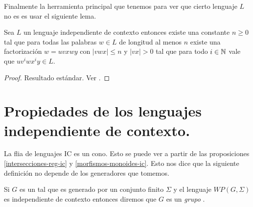 \documentclass[tesis.tex]{subfiles}
\begin{document}
Finalmente la herramienta principal que tenemos para ver que cierto lenguaje $L$ no es \ic es usar el siguiente lema.

\begin{lema}[Pumping] \label{pumping}
	Sea $L$ un lenguaje independiente de contexto entonces existe una constante $n \ge 0$ tal que para todas las palabras $w \in L$ de longitud al menos $n$ existe una factorización $w = uvxwy$ con $|vwx| \le n$ y $|vx| > 0$ tal que para todo $i \in \mathbb{N}$ vale que $uv^iwx^iy \in L$.
\end{lema}

\begin{proof}
	Resultado estándar. Ver \cite{hopcraft-ullman}.
\end{proof}





\section{Propiedades de los lenguajes independiente de contexto.}\label{secc_grp_ic}

La flia de lenguajes $\text{IC}$ es un cono.
Esto se puede ver a partir de las proposiciones  \ref{intersecciones-reg-ic} y \ref{morfismos-monoides-ic}.
Esto nos dice que la siguiente definición no depende de los generadores que tomemos.

\begin{deff}
	Si $G$ es un \fg tal que es generado por un conjunto finito $\Sigma$ y el lenguaje $WP(G, \Sigma)$ es independiente de contexto entonces diremos que $G$ es un \emph{grupo \ic }.
\end{deff}
\end{document}
